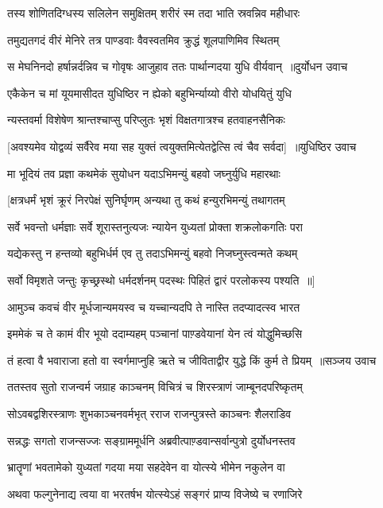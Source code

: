 \twolineshloka
{तस्य शोणितदिग्धस्य सलिलेन समुक्षितम्}
{शरीरं स्म तदा भाति स्रवन्निव महीधारः}


\twolineshloka
{तमुद्यतगदं वीरं मेनिरे तत्र पाण्डवाः}
{वैवस्वतमिव क्रुद्धं शूलपाणिमिव स्थितम्}


\threelineshloka
{स मेघनिनदो हर्षान्नर्दन्निव च गोवृषः}
{आजुहाव ततः पार्थान्गदया युधि वीर्यवान् ॥दुर्योधन उवाच}
{}


\twolineshloka
{एकैकेन च मां यूयमासीदत युधिष्ठिर}
{न ह्येको बहुभिर्न्याय्यो वीरो योधयितुं युधि}


\twolineshloka
{न्यस्तवर्मा विशेषेण श्रान्तश्चाप्सु परिप्लुतः}
{भृशं विक्षतगात्रश्च हतवाहनसैनिकः}


\threelineshloka
{[अवश्यमेव योद्वव्यं सर्वैरेव मया सह}
{युक्तं त्वयुक्तमित्येतद्वेत्सि त्वं चैव सर्वदा] ॥युधिष्ठिर उवाच}
{}


\twolineshloka
{मा भूदियं तव प्रज्ञा कथमेकं सुयोधन}
{यदाऽभिमन्युं बहवो जघ्नुर्युधि महारथाः}


\twolineshloka
{[क्षत्रधर्मं भृशं क्रूरं निरपेक्षं सुनिर्घृणम्}
{अन्यथा तु कथं हन्युरभिमन्युं तथागतम्}


\twolineshloka
{सर्वे भवन्तो धर्मज्ञाः सर्वे शूरास्तनुत्यजः}
{न्यायेन युध्यतां प्रोक्ता शक्रलोकगतिः परा}


\twolineshloka
{यद्येकस्तु न हन्तव्यो बहुभिर्धर्म एव तु}
{तदाऽभिमन्युं बहवो निजघ्नुस्त्वन्मते कथम्}


\twolineshloka
{सर्वो विमृशते जन्तुः कृच्छ्रस्थो धर्मदर्शनम्}
{पदस्थः पिहितं द्वारं परलोकस्य पश्यति ॥]}


\twolineshloka
{आमुञ्च कवचं वीर मूर्धजान्यमयस्व च}
{यच्चान्यदपि ते नास्ति तदप्यादत्स्व भारत}


\twolineshloka
{इममेकं च ते कामं वीर भूयो ददाम्यहम्}
{पञ्चानां पाण़्डवेयानां येन त्वं योद्धुमिच्छसि}


\threelineshloka
{तं हत्वा वै भवाराजा हतो वा स्वर्गमाप्नुहि}
{ऋते च जीविताद्वीर युद्धे किं कुर्म ते प्रियम् ॥सञ्जय उवाच}
{}


\twolineshloka
{ततस्तव सुतो राजन्वर्म जग्राह काञ्चनम्}
{विचित्रं च शिरस्त्राणं जाम्बूनदपरिष्कृतम्}


\twolineshloka
{सोऽवबद्वशिरस्त्राणः शुभकाञ्चनवर्मभृत्}
{रराज राजन्पुत्रस्ते काञ्चनः शैलराडिव}


\twolineshloka
{सन्नद्धः सगतो राजन्सज्जः सङ्ग्राममूर्धनि}
{अब्रवीत्पाण़्डवान्सर्वान्पुत्रो दुर्योधनस्तव}


\twolineshloka
{भ्रातॄणां भवतामेको युध्यतां गदया मया}
{सहदेवेन वा योत्स्ये भीमेन नकुलेन वा}


\twolineshloka
{अथवा फल्गुनेनाद्य त्वया वा भरतर्षभ}
{योत्स्येऽहं सङ्गरं प्राप्य विजेष्ये च रणाजिरे}



